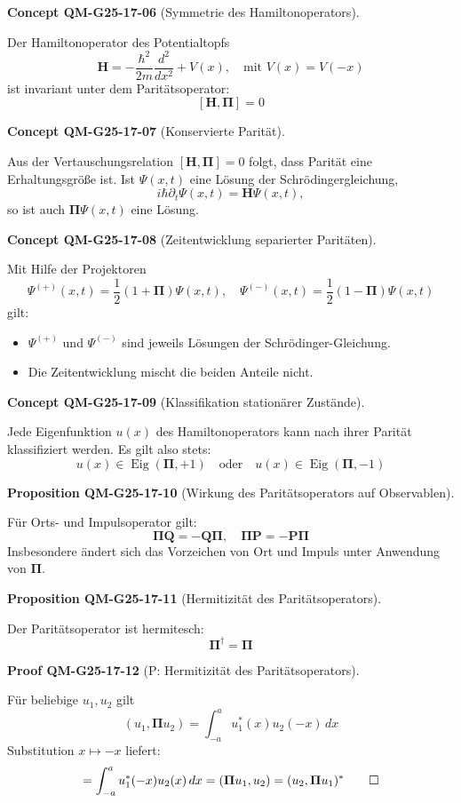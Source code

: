 \documentclass[10pt, letterpaper]{article}
\newcommand{\CustomHeading}[3]{%
  \par\medskip\noindent%
  \textbf{#1 #2} \textnormal{(#3)}.\enskip%
}
\newenvironment{PROP}[2]{\CustomHeading{Proposition}{#1}{#2}}{}
\newenvironment{CONC}[2]{\CustomHeading{Concept}{#1}{#2}}{}
\newenvironment{PROOF}[2]{\CustomHeading{Proof}{#1}{#2}}{}
\begin{document}
\begin{CONC}{QM-G25-17-06}{Symmetrie des Hamiltonoperators}
Der Hamiltonoperator des Potentialtopfs
\[
\mathbf{H} = -\frac{\hbar^2}{2m} \frac{d^2}{dx^2} + V(x), \quad \text{mit } V(x) = V(-x)
\]
ist invariant unter dem Paritätsoperator:
\[
[\mathbf{H}, \boldsymbol{\Pi}] = 0
\]
\end{CONC}

\begin{CONC}{QM-G25-17-07}{Konservierte Parität}
Aus der Vertauschungsrelation $[\mathbf{H}, \boldsymbol{\Pi}] = 0$ folgt, dass Parität eine Erhaltungsgröße ist. Ist $\Psi(x,t)$ eine Lösung der Schrödingergleichung,
\[
i \hbar \partial_t \Psi(x,t) = \mathbf{H} \Psi(x,t),
\]
so ist auch $\boldsymbol{\Pi} \Psi(x,t)$ eine Lösung.
\end{CONC}

\begin{CONC}{QM-G25-17-08}{Zeitentwicklung separierter Paritäten}
Mit Hilfe der Projektoren
\[
\Psi^{(+)}(x, t) = \frac{1}{2}(1 + \boldsymbol{\Pi}) \Psi(x,t), \quad \Psi^{(-)}(x, t) = \frac{1}{2}(1 - \boldsymbol{\Pi}) \Psi(x,t)
\]
gilt:
\begin{itemize}
\item $\Psi^{(+)}$ und $\Psi^{(-)}$ sind jeweils Lösungen der Schrödinger-Gleichung.
\item Die Zeitentwicklung mischt die beiden Anteile nicht.
\end{itemize}
\end{CONC}

\begin{CONC}{QM-G25-17-09}{Klassifikation stationärer Zustände}
Jede Eigenfunktion $u(x)$ des Hamiltonoperators kann nach ihrer Parität klassifiziert werden. Es gilt also stets:
\[
u(x) \in \operatorname{Eig}(\boldsymbol{\Pi}, +1) \quad \text{oder} \quad u(x) \in \operatorname{Eig}(\boldsymbol{\Pi}, -1)
\]
\end{CONC}

\begin{PROP}{QM-G25-17-10}{Wirkung des Paritätsoperators auf Observablen}
Für Orts- und Impulsoperator gilt:
\[
\boldsymbol{\Pi} \mathbf{Q} = -\mathbf{Q} \boldsymbol{\Pi}, \quad \boldsymbol{\Pi} \mathbf{P} = -\mathbf{P} \boldsymbol{\Pi}
\]
Insbesondere ändert sich das Vorzeichen von Ort und Impuls unter Anwendung von $\boldsymbol{\Pi}$.
\end{PROP}

\begin{PROP}{QM-G25-17-11}{Hermitizität des Paritätsoperators}
Der Paritätsoperator ist hermitesch:
\[
\boldsymbol{\Pi}^\dagger = \boldsymbol{\Pi}
\]
\end{PROP}

\begin{PROOF}{QM-G25-17-12}{P: Hermitizität des Paritätsoperators}
Für beliebige $u_1, u_2$ gilt
\[
(u_1, \boldsymbol{\Pi} u_2) = \int_{-a}^{a} u_1^*(x) u_2(-x)\, dx
\]
Substitution $x \mapsto -x$ liefert:
\[
= \int_{-a}^{a} u_1^*(-x) u_2(x)\, dx = (\boldsymbol{\Pi} u_1, u_2) = (u_2, \boldsymbol{\Pi} u_1)^*
\qed
\]
\end{PROOF}
\end{document}
